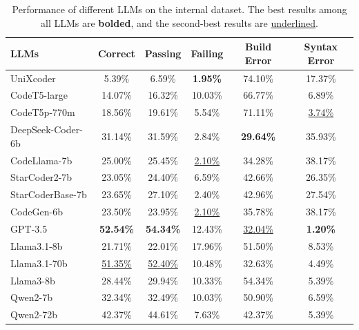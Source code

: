 \begin{table}[htbp]
\centering
\small
\caption{Performance of different LLMs on the internal dataset. The best results among all LLMs are \textbf{bolded}, and the second-best results are \uline{underlined}.}
\label{tab:discussion_utbench}
\begin{tabular}{lccccc}
\toprule
\textbf{LLMs} & \textbf{Correct} & \textbf{Passing} & \textbf{Failing} & \textbf{Build Error} & \textbf{Syntax Error} \\
\midrule
UniXcoder         & 5.39\%  & 6.59\%  & \textbf{1.95\%}  & 74.10\%  & 17.37\% \\
CodeT5-large      & 14.07\% & 16.32\% & 10.03\% & 66.77\%  & 6.89\%  \\
CodeT5p-770m      & 18.56\% & 19.61\% & 5.54\%  & 71.11\%  & \uline{3.74\%}  \\
DeepSeek-Coder-6b & 31.14\% & 31.59\% & 2.84\%  & \textbf{29.64\%}  & 35.93\% \\
CodeLlama-7b      & 25.00\% & 25.45\% & \uline{2.10\%}  & 34.28\%  & 38.17\% \\  
StarCoder2-7b     & 23.05\% & 24.40\% & 6.59\%  & 42.66\%  & 26.35\% \\
StarCoderBase-7b  & 23.65\% & 27.10\% & 2.40\%  & 42.96\%  & 27.54\% \\
CodeGen-6b        & 23.50\% & 23.95\% & \uline{2.10\%}  & 35.78\%  & 38.17\% \\
\midrule
GPT-3.5           & \textbf{52.54\%} & \textbf{54.34\%} & 12.43\% & \uline{32.04\%}  & \textbf{1.20\%}  \\
Llama3.1-8b       & 21.71\% & 22.01\% & 17.96\% & 51.50\%  & 8.53\% \\
Llama3.1-70b      & \uline{51.35\%} & \uline{52.40\%} & 10.48\% & {32.63\%}  & 4.49\% \\
Llama3-8b         & 28.44\% & 29.94\% & 10.33\% & 54.34\%  & 5.39\%  \\
Qwen2-7b          & 32.34\% & 32.49\% & 10.03\% & {50.90\%}  & 6.59\% \\
Qwen2-72b         & 42.37\% & 44.61\% & 7.63\% & 42.37\%  & 5.39\%  \\
\bottomrule
\end{tabular}
\end{table}
